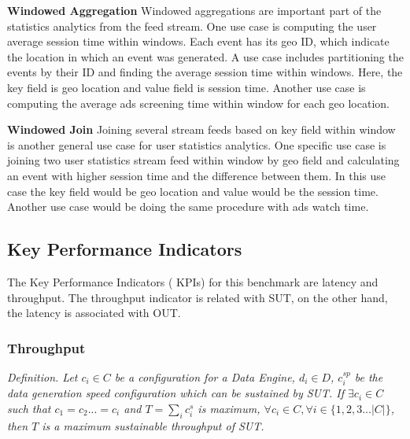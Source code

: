 \textbf{Windowed Aggregation}
Windowed aggregations are important part of the statistics analytics from the feed stream. One use case is computing the user average session time within windows. Each event has its geo ID, which indicate the location in which an event was generated. A use case includes partitioning the events by their ID and finding the average session time within windows. Here, the key field is geo location and value field is session time. Another use case is computing the average ads screening time within window for each geo location. 

\textbf{Windowed Join}
Joining several stream feeds based on key field within window is another general use case for user statistics analytics. One specific use case is joining two user statistics stream feed within window by geo field and calculating an event with higher session time and the difference between them. In this use case the key field would be geo location and value would be the session time. Another use case would be doing the same procedure with ads watch time. 


\subsection{Key Performance Indicators}
The Key Performance Indicators ( KPIs) for this benchmark are latency and throughput. The throughput indicator is related with SUT, on the other hand, the latency is associated with OUT. 


%


\subsubsection{Throughput}
\textit{Definition.  Let $c_{i} \in C$ be a configuration for a Data Engine, $d_{i} \in D$,  $c_{i}^{sp}$ be the data generation speed configuration which can be sustained by SUT. If  $\exists c_{i} \in C$ such that $c_{1} = c_{2}... = c_{i}$ and  $T = \sum_{i}c_{i}^{s}$ is maximum, $\forall c_{i} \in C, \forall i \in \{1,2,3 ... |C|\}$, then $T$ is a maximum sustainable throughput of SUT.}

